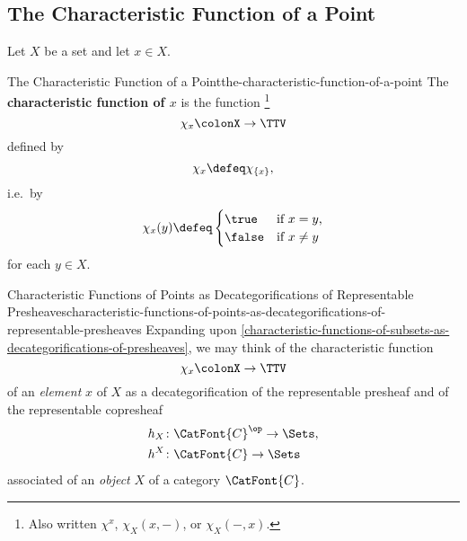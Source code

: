 \subsection{The Characteristic Function of a Point}\label{subsection-the-characteristic-function-of-a-point}
Let $X$ be a set and let $x\in X$.
\begin{definition}{The Characteristic Function of a Point}{the-characteristic-function-of-a-point}%
    The \textbf{characteristic function of $x$} is the function%
    \footnote{%
        Also written $\chi^{x}$, $\chi_{X}(x,-)$, or $\chi_{X}(-,x)$.
    }%
    \[%
        \chi_{x}%
        \colon%
        X%
        \to%
        \TTV%
    \]%
    defined by%
    \[
        \chi_{x}
        \defeq
        \chi_{\{x\}},%
    \]%
    i.e.\ by%
    \[
        \chi_{x}(y)
        \defeq
        \begin{cases}
            \true  &\text{if $x=y$,}\\
            \false &\text{if $x\neq y$}
        \end{cases}
    \]%
    for each $y\in X$.
\end{definition}
\begin{remark}{Characteristic Functions of Points as Decategorifications of Representable Presheaves}{characteristic-functions-of-points-as-decategorifications-of-representable-presheaves}%
    Expanding upon \cref{characteristic-functions-of-subsets-as-decategorifications-of-presheaves}, we may think of the characteristic function%
    \[%
        \chi_{x}%
        \colon%
        X%
        \to%
        \TTV%
    \]%
    of an \emph{element} $x$ of $X$ as a decategorification of the representable presheaf and of the representable copresheaf
    \begin{align*}
        h_{X} &\colon \CatFont{C}^{\op} \to \Sets,\\%
        h^{X} &\colon \CatFont{C}       \to \Sets%
    \end{align*}
    associated of an \emph{object} $X$ of a category $\CatFont{C}$.
\end{remark}%
